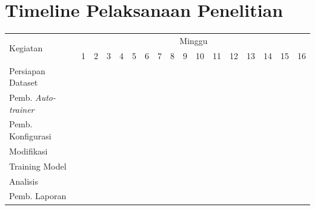 \section{Timeline Pelaksanaan Penelitian}
  \newcommand{\w}{}
  \newcommand{\G}{\cellcolor{gray}}
  \begin{table}[h!]
    \label{tbl:timeline}
    \begin{tabular}{|p{3.5cm}|c|c|c|c|c|c|c|c|c|c|c|c|c|c|c|c|}
  
      \hline
      \multirow{2}{*}{Kegiatan} & \multicolumn{16}{|c|}{Minggu} \\
      \cline{2-17} &
      1 & 2 & 3 & 4 & 5 & 6 & 7 & 8 & 9 & 10 & 11 & 12 & 13 & 14 & 15 & 16 \\
      \hline
  
      Persiapan Dataset &
      \G & \w & \w & \w & \w & \w & \w & \w & \w & \w & \w & \w & \w & \w & \w & \w \\
      \hline
  
      Pemb. \emph{Auto-trainer} &
      \w & \G & \w & \w & \w & \w & \w & \w & \w & \w & \w & \w & \w & \w & \w & \w \\
      \hline
  
      Pemb. Konfigurasi&
      \w & \w & \G & \G & \G & \G & \G & \G & \G & \G & \G & \G & \w & \w & \w & \w \\
      Modifikasi &
      \w & \w & \G & \G & \G & \G & \G & \G & \G & \G & \G & \G & \w & \w & \w & \w \\
      \hline
  
      Training Model &
      \w & \w & \G & \G & \G & \G & \G & \G & \G & \G & \G & \G & \w & \w & \w & \w \\
      \hline

      Analisis &
      \w & \w & \G & \G & \G & \G & \G & \G & \G & \G & \G & \G & \G & \w & \w & \w \\
      \hline

      Pemb. Laporan &
      \w & \w & \w & \w & \w & \w & \w & \w & \w & \w & \w & \w & \G & \G & \G & \G \\
      \hline
  
    \end{tabular}
  \end{table}

